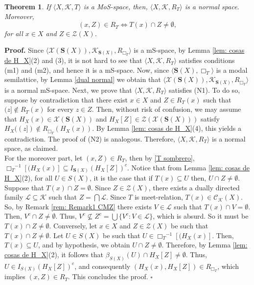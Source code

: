 \documentclass{article}
\newtheorem{theorem}{\bf Theorem}[section]
\newenvironment{proof}
{\par\noindent\textbf{Proof. }\rm}
{\hfill$\boldsymbol{\square}$\par\vspace{0.3cm}}
\begin{document}
\begin{theorem}\label{theo: MoS-spaces to Normal spaces}
If $\langle X, \mathcal{K}, T \rangle$ is a MoS-space, then, $\langle X, \mathcal{K},  R_T\rangle$ is a normal space. Moreover, \begin{equation}
    (x,Z) \in R_T \iff T(x) \cap Z \neq \emptyset,
\end{equation}
for all $x\in X$ and $Z\in \mathcal{Z}(X)$.
\end{theorem}
\begin{proof}
    Since $\langle \mathcal{X}(\mathbf{S}(X)), \mathcal{K}_{\mathbf{S}(X)}, R_{\Box_T}\rangle$ is a mS-space, by Lemma \ref{lem: cosas de H_X}(2) and (3), it is not hard to see that $\langle X, \mathcal{K}, R_T\rangle$ satisfies conditions (m1) and (m2), and hence it is a mS-space. Now, since $\langle \mathbf{S}(X),\Box_T\rangle$ is a modal semilattice, by Lemma \ref{dual normal} we obtain that $\langle \mathcal{X}(\mathbf{S}(X)), \mathcal{K}_{\mathbf{S}(X)}, R_{\Box_T}\rangle$ is a normal mS-space. Next, we prove that $\langle X, \mathcal{K}, R_T\rangle$ satisfies (N1). To do so, suppose by contradiction that there exist $x\in X$ and $Z\in R_{T}(x)$ such that $(z]\notin R_T(x)$ for every $z\in Z$. Then, without risk of confusion, we may assume that $H_X(x)\in \mathcal{X}(\mathbf{S}(X))$ and $H_X[Z]\in \mathcal{Z}(\mathcal{X}(\mathbf{S}(X)))$ satisfy $H_X((z])\notin R_{\Box_T}(H_X(x))$. By Lemma \ref{lem: cosas de H_X}(4), this yields a contradiction. The proof of (N2) is analogous. Therefore, $\langle X, \mathcal{K}, R_T\rangle$ is a normal space, as claimed.
    \\
    For the moreover part, let $(x,Z)\in R_T$, then by \eqref{T sombrero}, ${\Box_T}^{-1}[(H_X(x)]\subseteq {I_{\mathbf{S}(X)}(H_X[Z])}^{c}$. Notice that from Lemma \ref{lem: cosas de H_X}(2), for all $U\in S(X)$, it is the case that if $T(x)\subseteq U$ then, $U\cap Z\neq \emptyset$. Suppose that $T(x)\cap Z=\emptyset$. Since $Z \in \mathcal{Z}(X)$, there exists a dually directed family $\mathcal{L}\subseteq\mathcal{K}$ such that  $Z=\bigcap\mathcal{L}$. Since $T$ is meet-relation, $T(x)\in \mathcal{C}_{\mathcal{K}}(X)$. So, by Remark \ref{rem: Remark1 CMZ} there
    exists $V\in \mathcal{L}$ such that $T(x)\cap V=\emptyset$. Then, $V^{c}\cap Z\not=\emptyset$. Thus, $V^c\nsubseteq Z^{c}=\bigcup \{V^c\colon V\in \mathcal{L}\}$, which is absurd. So it must be $T(x)\cap Z \neq \emptyset$. Conversely, let $x \in X$ and $Z \in \mathcal{Z}(X)$ be such that $T(x)\cap Z\neq\emptyset$. Let $U \in S(X)$ be such that $U\in {\Box_T}^{-1}[(H_X(x)]$. Then, $T(x)\subseteq U$, and by hypothesis, we obtain $U \cap Z\neq \emptyset$. Therefore, by Lemma \ref{lem: cosas de H_X}(2), it follows that $\beta_{S(X)}(U) \cap H_{X}[Z]\neq \emptyset$. Thus, $U \in {I_{S(X)}(H_X[Z])}^{c}$, and consequently $(H_X(x),H_X[Z]) \in R_{\Box_T}$, which implies $(x,Z) \in R_T$. This concludes the proof.
\end{proof}
\end{document}
